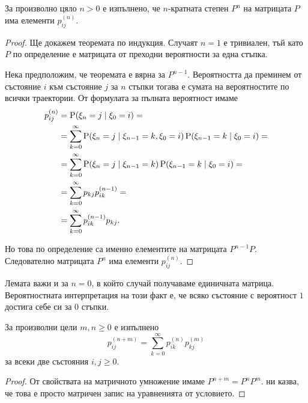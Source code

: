 \documentclass{../../common/topic}
\begin{document}
\begin{lemma}\label{thm:transition_matrix_power}
  За произволно цяло \( n > 0 \) е изпълнено, че \( n \)-кратната степен \( P^n \) на матрицата \( P \) има елементи \( p_{ij}^{(n)} \).
\end{lemma}
\begin{proof}
  Ще докажем теоремата по индукция. Случаят \( n = 1 \) е тривиален, тъй като \( P \) по определение е матрицата от преходни вероятности за една стъпка.

  Нека предположим, че теоремата е вярна за \( P^{n-1} \). Вероятността да преминем от състояние \( i \) към състояние \( j \) за \( n \) стъпки тогава е сумата на вероятностите по всички траектории. От формулата за пълната вероятност имаме
  \begin{align*}
    p^{(n)}_{ij}
    &=
    \operatorname{P}(\xi_n = j \mid \xi_0 = i)
    = \\ &=
    \sum_{k=0}^\infty \operatorname{P}(\xi_n = j \mid \xi_{n-1} = k, \xi_0 = i) \operatorname{P}(\xi_{n-1} = k \mid \xi_0 = i)
    = \\ &=
    \sum_{k=0}^\infty \operatorname{P}(\xi_n = j \mid \xi_{n-1} = k) \operatorname{P}(\xi_{n-1} = k \mid \xi_0 = i)
    = \\ &=
    \sum_{k=0}^\infty p_{kj} p^{(n-1)}_{ik}
    = \\ &=
    \sum_{k=0}^\infty p^{(n-1)}_{ik} p_{kj}.
  \end{align*}

  Но това по определение са именно елементите на матрицата \( P^{n-1} P \). Следователно матрицата \( P^n \) има елементи \( p^{(n)}_{ij} \).
\end{proof}

\begin{remark}
  Лемата важи и за \( n = 0 \), в който случай получаваме единичната матрица. Вероятностната интерпретация на този факт е, че всяко състояние с вероятност \( 1 \) достига себе си за \( 0 \) стъпки.
\end{remark}

\begin{theorem}\label{thm:chapman_kolmogorov}
  За произволни цели \( m, n \geq 0 \) е изпълнено
  \begin{equation*}
    p^{(n+m)}_{ij} = \sum_{k=0}^\infty p^{(n)}_{ik} p^{(m)}_{kj}
  \end{equation*}
  за всеки две състояния \( i, j \geq 0 \).
\end{theorem}
\begin{proof}
  От свойствата на матричното умножение имаме \( P^{n+m} = P^n P^m \).  ни казва, че това е просто матричен запис на уравненията от условието.
\end{proof}
\end{document}

